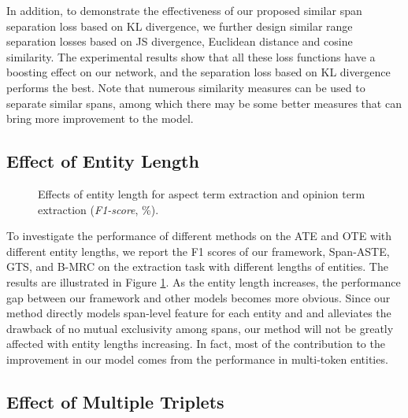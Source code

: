 \documentclass[11pt]{article}
\begin{document}
In addition, to demonstrate the effectiveness of our proposed similar span separation loss based on KL divergence, we further design similar range separation losses based on JS divergence, Euclidean distance and cosine similarity. The experimental results show that all these loss functions have a boosting effect on our network, and the separation loss based on KL divergence performs the best. Note that numerous similarity measures can be used to separate similar spans, among which there may be some better measures that can bring more improvement to the model.
\subsection{Effect of Entity Length}
\begin{figure}[t]
	\centering
	\hfil
	\hfil
	\caption{Effects of entity length for aspect term extraction and opinion term extraction (\emph{F1-score}, \%).}
	\label{Target length}
\end{figure}

To investigate the performance of different methods on the ATE and OTE with different entity lengths, we report the F1 scores of our framework, Span-ASTE, GTS, and B-MRC on the extraction task with different lengths of entities. The results are illustrated in Figure \ref{Target length}. As the entity length increases, the performance gap between our framework and other models becomes more obvious. Since our method directly models span-level feature for each entity and and alleviates the drawback of no mutual exclusivity among spans, our method will not be greatly affected with entity lengths increasing. In fact, most of the contribution to the improvement in our model comes from the performance in multi-token entities.

\subsection{Effect of Multiple Triplets}
\end{document}
